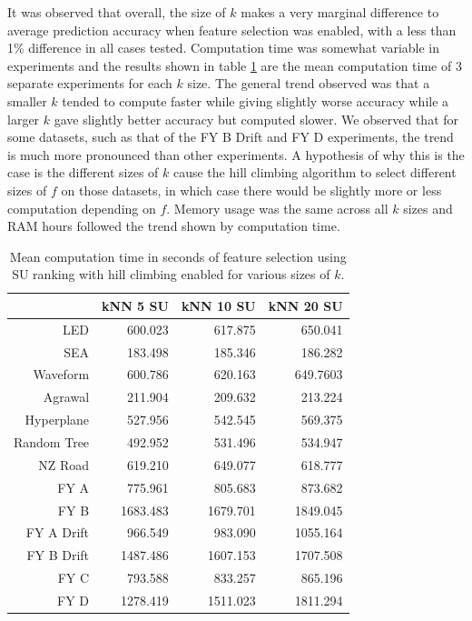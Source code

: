 It was observed that overall, the size of $k$ makes a very marginal difference to average prediction accuracy when feature selection was enabled, with a less than 1\% difference in all cases tested. Computation time was somewhat variable in experiments and the results shown in table \ref{Table:K_Table_Time} are the mean computation time of 3 separate experiments for each $k$ size. The general trend observed was that a smaller $k$ tended to compute faster while giving slightly worse accuracy while a larger $k$ gave slightly better accuracy but computed slower. We observed that for some datasets, such as that of the FY B Drift and FY D experiments, the trend is much more pronounced than other experiments. A hypothesis of why this is the case is the different sizes of $k$ cause the hill climbing algorithm to select different sizes of $f$ on those datasets, in which case there would be slightly more or less computation depending on $f$. Memory usage was the same across all $k$ sizes and RAM hours followed the trend shown by computation time.

\begin{table}[h]
\centering
\begin{tabular}{r|rrr}                           
						   & kNN 5 SU & kNN 10 SU & kNN 20 SU \\  \hline
LED                        & 600.023  & 617.875   & 650.041  \\
SEA                        & 183.498  & 185.346   & 186.282  \\
Waveform                   & 600.786  & 620.163   & 649.7603  \\
Agrawal                    & 211.904  & 209.632   & 213.224  \\
Hyperplane                 & 527.956  & 542.545   & 569.375   \\
Random Tree                & 492.952  & 531.496   & 534.947  \\
NZ Road                    & 619.210  & 649.077   & 618.777  \\
FY A                       & 775.961  & 805.683   & 873.682  \\
FY B                       & 1683.483 & 1679.701  & 1849.045  \\
FY A Drift                 & 966.549  & 983.090   & 1055.164  \\
FY B Drift                 & 1487.486 & 1607.153  & 1707.508  \\
FY C                       & 793.588  & 833.257   & 865.196   \\
FY D                       & 1278.419 & 1511.023  & 1811.294
\end{tabular}
\caption{Mean computation time in seconds of feature selection using SU ranking with hill climbing enabled for various sizes of $k$.}
\label{Table:K_Table_Time}
\end{table}


